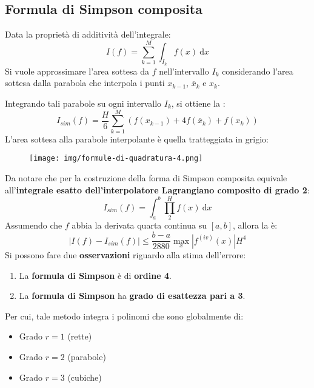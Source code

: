 \subsection{Formula di Simpson composita}

Data la proprietà di additività dell'integrale:
\begin{equation*}
	I\left(f\right) = \displaystyle\sum_{k=1}^{M} \int_{I_{k}} f\left(x\right) \:\mathrm{d}x
\end{equation*}
Si vuole approssimare l'area sottesa da $f$ nell'intervallo $I_{k}$ considerando l'area sottesa dalla parabola che interpola i punti $x_{k-1}$, $\overline{x}_{k}$ e $x_{k}$.

\highspace
Integrando tali parabole su ogni intervallo $I_{k}$, si ottiene la :
\begin{equation}
	I_{sim}\left(f\right) = \dfrac{H}{6} \displaystyle\sum_{k=1}^{M} \left(f\left(x_{k-1}\right) + 4f\left(\overline{x}_{k}\right) + f\left(x_{k}\right)\right)
\end{equation}
L'area sottesa alla parabole interpolante è quella tratteggiata in grigio:
\begin{figure}[!htp]
	\centering
	\texttt{[image: img/formule-di-quadratura-4.png]}
\end{figure}

\noindent
Da notare che per la costruzione della forma di Simpson composita equivale all'\textbf{integrale esatto dell'interpolatore Lagrangiano composito di grado 2}:
\begin{equation}
	I_{sim}\left(f\right) = \displaystyle\int_{a}^{b} \displaystyle\prod_{2}^{H} f\left(x\right) \:\mathrm{d}x
\end{equation}
Assumendo che $f$ abbia la derivata quarta continua su $\left[a,b\right]$, allora la  è:
\begin{equation}
	\left|I\left(f\right) - I_{sim}\left(f\right)\right| \le \dfrac{b-a}{2880} \underset{x}{\max} \left|f^{\left(iv\right)}\left(x\right)\right| H^{4}
\end{equation}
Si possono fare due \textbf{osservazioni} riguardo alla stima dell'errore:
\begin{enumerate}
	\item La \textbf{formula di Simpson} è di \textbf{ordine 4}.
	
	\item La \textbf{formula di Simpson} ha \textbf{grado di esattezza pari a 3}.
\end{enumerate}
Per cui, tale metodo integra i polinomi che sono globalmente di: 
\begin{itemize}
	\item Grado $r=1$ (rette)
	\item Grado $r=2$ (parabole)
	\item Grado $r=3$ (cubiche)
\end{itemize}
